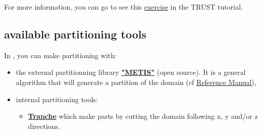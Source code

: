 For more information, you can go to see this \href{TRUST_tutorial.pdf\#exo_para_2}{exercise} in the TRUST tutorial.



\subsection{\trust available partitioning tools} \label{partitioner}
In \trust, you can make partitioning with:
\begin{itemize}
\item the external partitionning library \href{http://glaros.dtc.umn.edu/gkhome/views/metis}{\textbf{"METIS"}} (open source). It is a general algorithm that will generate a partition of the domain (cf \href{TRUST_Reference_Manual.pdf\#partitionneurmetis}{\trust Reference Manual}),
\begin{center}
\end{center}

\item internal \trust partitioning tools:
    \begin{itemize}
    \item \href{TRUST_Reference_Manual.pdf\#partitionneurtranche}{\textbf{Tranche}} which make parts by cutting the domain following x, y and/or z directions.
    \begin{center}
\end{center}
\end{itemize}
\end{itemize}
